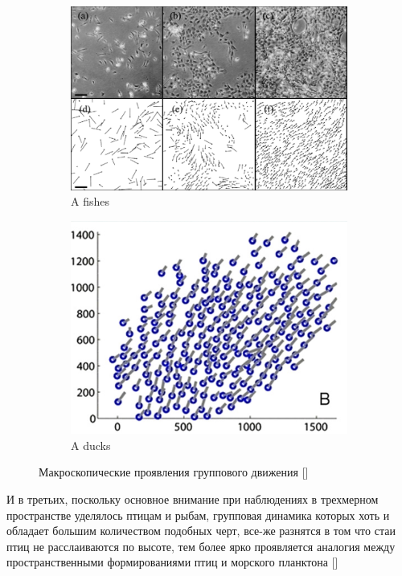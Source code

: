     \begin{figure}
    	\centering
        \begin{subfigure}{0.4\textwidth}
                \includegraphics[width=\textwidth]{Fig17_CollectiveMotion}
                \caption{A fishes}
                \label{fig:CollMot:Birds}
        \end{subfigure}
        \begin{subfigure}{0.4\textwidth}
                \includegraphics[width=\textwidth]{Fig29_CollectiveMotion_part}
                \caption{A ducks}
                \label{fig:CollMot:Plancton}
        \end{subfigure}
        \caption{Макроскопические проявления группового движения []}\label{fig:CollMot:Volumetric}
	\end{figure}

	И в третьих, поскольку основное внимание при наблюдениях в трехмерном пространстве уделялось птицам и рыбам, групповая динамика которых хоть и обладает большим количеством подобных черт, все-же разнятся в том что стаи птиц не расслаиваются по высоте, тем более ярко проявляется аналогия между пространственными формированиями птиц и морского планктона []%

